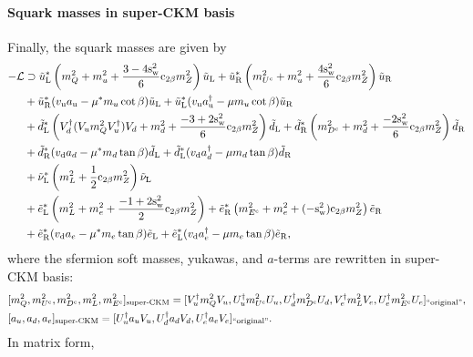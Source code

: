 \documentclass[CheatSheet]{subfiles}
\begin{document}
\paragraph{Squark masses in super-CKM basis}
Finally, the squark masses are given by
\begin{equation}
 \begin{split}
-\mathcal L&\supset
 \tilde u_{\mathrm{L}}^*\left(
   m_{Q}^2
 +  m_u^2
 + \frac{3-4\mathrm{s}_{\mathrm w}^2}{6} \mathrm{c}_{2\beta} m_Z^2
\right)\tilde u_{\mathrm{L}}
 +\tilde u_{\mathrm{R}}^*\left(
   m_{U^{\mathrm{c}}}^2
 + m_u^2
 + \frac{4\mathrm{s}_{\mathrm w}^2}{6} \mathrm{c}_{2\beta} m_Z^2
\right)\tilde u_{\mathrm{R}}
\\&
 + \tilde u_{\mathrm{R}}^*(v_{\mathrm{u}} a_{{\mathrm u}}- \mu^{*}m_{u}\cot\beta)\tilde u_{\mathrm{L}}
 + \tilde u_{\mathrm{L}}^*(v_{\mathrm{u}} a^{\dagger}_{{\mathrm u}}- \mu m_u\cot\beta)\tilde u_{\mathrm{R}}
\\&
 +\tilde d_{\mathrm{L}}^*\left(
V_d^\dagger (V_u m_{Q}^2 V_u^\dagger)V_d
 + m_d^2
 + \frac{-3+2\mathrm{s}_{\mathrm w}^2}{6} \mathrm{c}_{2\beta} m_Z^2
\right)\tilde d_{\mathrm{L}}
 +\tilde d_{\mathrm{R}}^*\left(
   m_{D^{\mathrm{c}}}^2
 + m_d^2
 + \frac{-2\mathrm{s}_{\mathrm w}^2}{6} \mathrm{c}_{2\beta} m_Z^2
\right)\tilde d_{\mathrm{R}}
\\&
 + \tilde d_{\mathrm{R}}^*(v_{\mathrm{d}} a_d -\mu^{*}m_d\tan\beta)\tilde d_{\mathrm{L}}
 + \tilde d_{\mathrm{L}}^*(v_{\mathrm{d}} a^{\dagger}_d-\mu m_d\tan\beta)\tilde d_{\mathrm{R}}
\\&
 +\tilde \nu_{\mathrm{L}}^*\left(
 m_{L}^2
 + \frac{1}{2} \mathrm{c}_{2\beta} m_Z^2
 \right)\tilde \nu_{\mathrm{L}}
\\&
 +\tilde e_{\mathrm{L}}^*\left(
 m_{L}^2
 + m_e^2
 + \frac{-1+2\mathrm{s}_{\mathrm w}^2}{2} \mathrm{c}_{2\beta} m_Z^2
\right)
 +\tilde e_{\mathrm{R}}^*\left(
  m_{E^{\mathrm{c}}}^2
 + m_e^2
 + (-\mathrm{s}_{\mathrm w}^2)\mathrm{c}_{2\beta} m_Z^2
 \right)\tilde e_{\mathrm{R}}
\\&
 + \tilde e_{\mathrm{R}}^*(v_{\mathrm{d}} a_e -\mu^{*}m_e\tan\beta)\tilde e_{\mathrm{L}}
 + \tilde e_{\mathrm{L}}^*(v_{\mathrm{d}} a^{\dagger}_e-\mu m_e\tan\beta)\tilde e_{\mathrm{R}},
 \end{split}
\end{equation}
where the sfermion soft masses, yukawas, and $a$-terms are rewritten in super-CKM basis:
\begin{align}
& [m_Q^2, m_{U^{\mathrm{c}}}^2, m_{D^{\mathrm{c}}}^2,m_L^2,m_{E^{\mathrm{c}}}^2]_{\text{super-CKM}}
=
 [V_u^\dagger m_Q^2 V_u, U_u^\dagger m_{U^{\mathrm{c}}}^2 U_u, U_d^\dagger m_{D^{\mathrm{c}}}^2 U_d, 
V_e^\dagger m_L^2 V_e, U_e^\dagger m_{E^{\mathrm{c}}}^2 U_e
]_{\text{``original''}},
\\
&[a_u, a_d, a_e]_{\text{super-CKM}}
=[U_u^\dagger a_u V_u, U_d^\dagger a_d V_d, U_e^\dagger a_e V_e
]_{\text{``original''}}.
\end{align}
In matrix form, 
\end{document}
